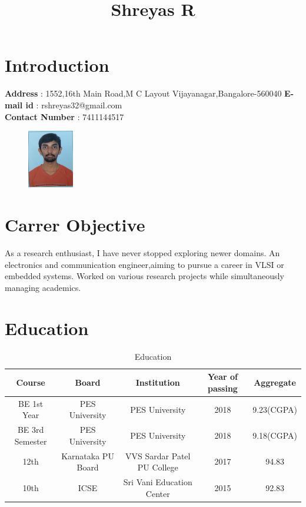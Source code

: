 \documentclass{article}
\title{\textbf{Shreyas R}}
\date{\vspace{-5ex}}
\begin{document}
	\maketitle
	\hrulefill
	
	\section{Introduction}
	\begin{flushleft}
		\textbf{Address} : 1552,16th Main Road,M C Layout
		Vijayanagar,Bangalore-560040
		\textbf{E-mail id} : rshreyas32@gmail.com
		\\\textbf{Contact Number} : 7411144517
		\begin{figure}[!ht]
			\begin{flushright}
				\includegraphics[width=20mm]{image.jpeg}
			\end{flushright}
		\end{figure}
	\end{flushleft}

	\section{Carrer Objective}
	As a research enthusiast, I have never stopped exploring newer domains. An electronics and communication engineer,aiming to pursue a career in VLSI or embedded systems. Worked on various research projects while simultaneously managing academics.
	
	\section{Education}
	\begin{table}[ht]
		\caption{Education}
		\centering
		\begin{tabular}{c c c c c}
			\hline\hline
			Course & Board & Institution & Year of passing & Aggregate \\[0.5ex]
			\hline
			BE 1st Year & PES University & PES University & 2018 & 9.23(CGPA) \\
			BE 3rd Semester & PES University & PES University & 2018 & 9.18(CGPA) \\
			12th & Karnataka PU Board & VVS Sardar Patel PU College  & 2017 & 94.83 \\
			10th & ICSE & Sri Vani Education Center & 2015 & 92.83 \\ 
			\hline
		\end{tabular}
		\label{table:nonlin}
	\end{table}
\end{document}
